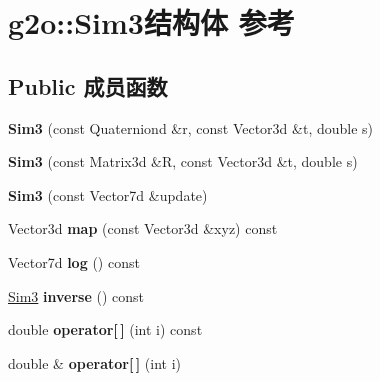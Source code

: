 \hypertarget{structg2o_1_1Sim3}{\section{g2o\-:\-:Sim3结构体 参考}
\label{structg2o_1_1Sim3}
}
\subsection*{Public 成员函数}
\begin{DoxyCompactItemize}
\item 
\hypertarget{structg2o_1_1Sim3_a3f7bc6953078a87865575192221def7e}{{\bfseries Sim3} (const Quaterniond \&r, const Vector3d \&t, double s)}\label{structg2o_1_1Sim3_a3f7bc6953078a87865575192221def7e}

\item 
\hypertarget{structg2o_1_1Sim3_a8163b7b417a91a758b10593929bae6c5}{{\bfseries Sim3} (const Matrix3d \&R, const Vector3d \&t, double s)}\label{structg2o_1_1Sim3_a8163b7b417a91a758b10593929bae6c5}

\item 
\hypertarget{structg2o_1_1Sim3_a252f62d72e8449ecc929a6ca0320fcbc}{{\bfseries Sim3} (const Vector7d \&update)}\label{structg2o_1_1Sim3_a252f62d72e8449ecc929a6ca0320fcbc}

\item 
\hypertarget{structg2o_1_1Sim3_a99390dd73f03245fa9f762328c07697f}{Vector3d {\bfseries map} (const Vector3d \&xyz) const }\label{structg2o_1_1Sim3_a99390dd73f03245fa9f762328c07697f}

\item 
\hypertarget{structg2o_1_1Sim3_a97e81fe7bee63edc34db9b174fecf30d}{Vector7d {\bfseries log} () const }\label{structg2o_1_1Sim3_a97e81fe7bee63edc34db9b174fecf30d}

\item 
\hypertarget{structg2o_1_1Sim3_a799f94914303ea87578ea7ab8e14bea9}{\hyperlink{structg2o_1_1Sim3}{Sim3} {\bfseries inverse} () const }\label{structg2o_1_1Sim3_a799f94914303ea87578ea7ab8e14bea9}

\item 
\hypertarget{structg2o_1_1Sim3_a024871a45dba00e199276b90f37e41bd}{double {\bfseries operator\mbox{[}$\,$\mbox{]}} (int i) const }\label{structg2o_1_1Sim3_a024871a45dba00e199276b90f37e41bd}

\item 
\hypertarget{structg2o_1_1Sim3_ac48ebd09209c2484896f2dfe8bc673bf}{double \& {\bfseries operator\mbox{[}$\,$\mbox{]}} (int i)}\label{structg2o_1_1Sim3_ac48ebd09209c2484896f2dfe8bc673bf}


\end{DoxyCompactItemize}
